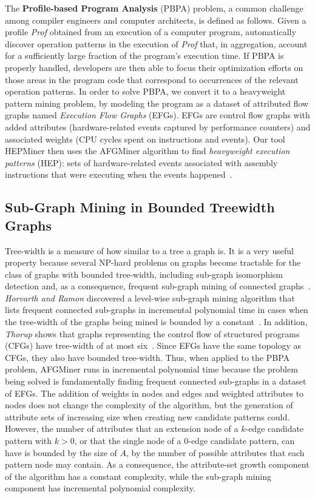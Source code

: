 The  {\bf Profile-based Program Analysis} (PBPA) problem, a common challenge among compiler engineers and computer architects, is defined as follows. Given a profile {\em Prof} obtained from an execution of a computer program, automatically discover operation patterns in the execution of {\em Prof} that, in aggregation, account for a sufficiently large fraction of the program's execution time. If PBPA is properly handled, developers are then able to focus their optimization efforts on those areas in the program code that correspond to occurrences of the relevant operation patterns. In order to solve PBPA, we convert it to a heavyweight pattern mining problem, by modeling the program as a dataset of attributed flow graphs named \emph{Execution Flow Graphs} (EFGs). EFGs are control flow graphs with added attributes (hardware-related events captured by performance counters) and associated weights (CPU cycles spent on instructions and events). Our tool HEPMiner then uses the AFGMiner algorithm to find \emph{heavyweight execution patterns} (HEP): sets of hardware-related events associated with assembly instructions that were executing when the events happened~\cite{GomesMSc12}.

\subsection{Sub-Graph Mining in Bounded Treewidth Graphs}

Tree-width is a measure of how similar to a tree a graph is. It is a very useful property because several NP-hard problems on graphs become tractable for the class of graphs with bounded tree-width, including sub-graph isomorphism detection and, as a consequence, frequent sub-graph mining of connected graphs~\cite{Horvath}. \emph{Horvarth and Ramon} discovered a level-wise sub-graph mining algorithm that lists frequent connected sub-graphs in incremental polynomial time in cases when the tree-width of the graphs being mined is bounded by a constant~\cite{Horvath}. In addition, \emph{Thorup} shows that graphs representing the control flow of structured programs (\ie CFGs) have tree-width of at most six~\cite{Thorup}.  Since EFGs have the same topology as CFGs, they also have bounded tree-width. Thus, when applied to the PBPA problem, AFGMiner runs in incremental polynomial time because the problem being solved is fundamentally finding frequent connected sub-graphs in a dataset of EFGs. The addition of weights in nodes and edges and weighted attributes to nodes does not change the complexity of the algorithm, but the generation of attribute sets of increasing size when creating new candidate patterns could. However, the number of attributes that an extension node of a $k$-edge candidate pattern with $k > 0$, or that the single node of a 0-edge candidate pattern, can have is bounded by the size of $A$, \ie by the number of possible attributes that each pattern node may contain. As a consequence, the attribute-set growth component of the algorithm has a constant complexity, while the sub-graph mining component has incremental polynomial complexity.


